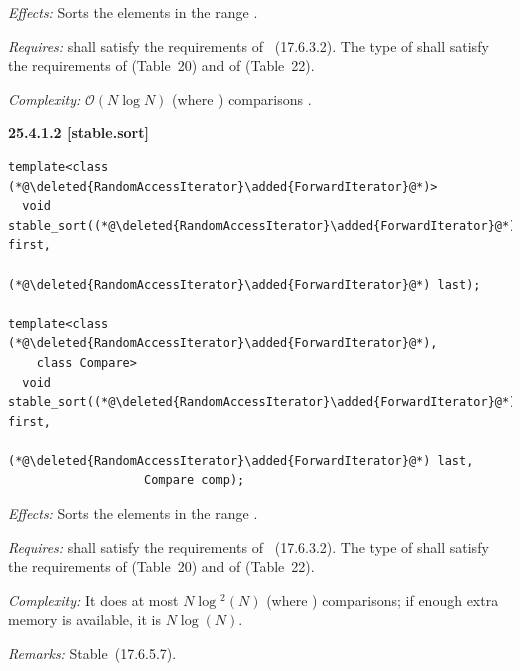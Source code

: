 \documentclass{isocpp_proposal}
\begin{document}
\begin{itemdescr}
\pnum
\emph{Effects:} Sorts the elements in the range \tcode{[first, last)}.

\pnum
\emph{Requires:}  shall satisfy the requirements of
~(17.6.3.2). The type of  shall satisfy the requirements of  (Table~20) and of \linebreak {} (Table~22).

\pnum
\emph{Complexity:} $\mathcal{O}(N \log{} N)$ (where ) comparisons .
\end{itemdescr}

\newpage

\textbf{25.4.1.2  [stable.sort]}

\begin{lstlisting}
template<class (*@\deleted{RandomAccessIterator}\added{ForwardIterator}@*)>
  void stable_sort((*@\deleted{RandomAccessIterator}\added{ForwardIterator}@*) first,
                   (*@\deleted{RandomAccessIterator}\added{ForwardIterator}@*) last);

template<class (*@\deleted{RandomAccessIterator}\added{ForwardIterator}@*),
    class Compare>
  void stable_sort((*@\deleted{RandomAccessIterator}\added{ForwardIterator}@*) first,
                   (*@\deleted{RandomAccessIterator}\added{ForwardIterator}@*) last,
                   Compare comp);
\end{lstlisting}

\begin{itemdescr}
\pnum
\emph{Effects:} Sorts the elements in the range \tcode{[first, last)}.

\pnum
\emph{Requires:}  shall satisfy the requirements of
~(17.6.3.2). The type of  shall satisfy the requirements of  (Table~20) and of \linebreak {} (Table~22).

\pnum
\emph{Complexity:} It does at most $N \log{}^2 (N)$ (where ) comparisons; if enough extra memory is available, it is $N \log{}(N)$.

\pnum
\emph{Remarks:} Stable~(17.6.5.7).
\end{itemdescr}
\end{document}
